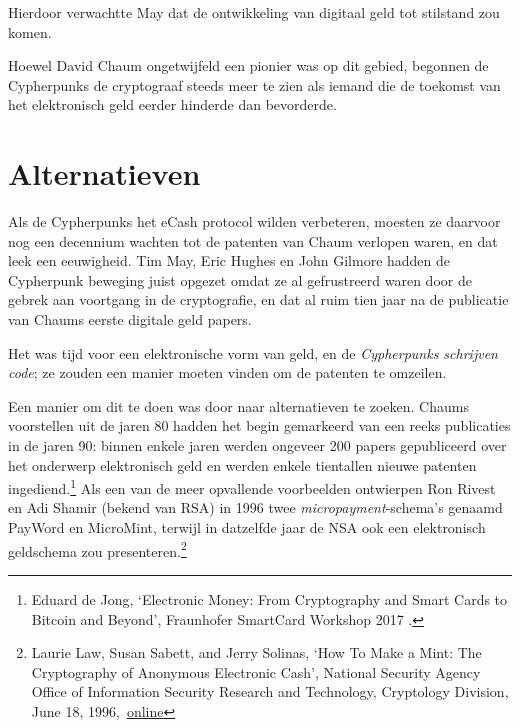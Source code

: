 \documentclass[
  a5paper,
  smalldemyvopaper,11pt,twoside,onecolumn,openright,extrafontsizes,
hidelinks]{memoir}
\begin{document}
Hierdoor verwachtte May dat de ontwikkeling van digitaal geld tot
stilstand zou komen.

Hoewel David Chaum ongetwijfeld een pionier was op dit gebied, begonnen
de Cypherpunks de cryptograaf steeds meer te zien als iemand die de
toekomst van het elektronisch geld eerder hinderde dan bevorderde.

\section{Alternatieven}\label{alternatieven}

Als de Cypherpunks het eCash protocol wilden verbeteren, moesten ze
daarvoor nog een decennium wachten tot de patenten van Chaum verlopen
waren, en dat leek een eeuwigheid. Tim May, Eric Hughes en John Gilmore
hadden de Cypherpunk beweging juist opgezet omdat ze al gefrustreerd
waren door de gebrek aan voortgang in de cryptografie, en dat al ruim
tien jaar na de publicatie van Chaums eerste digitale geld papers.

Het was tijd voor een elektronische vorm van geld, en de
\emph{Cypherpunks schrijven code}; ze zouden een manier moeten vinden om
de patenten te omzeilen.

Een manier om dit te doen was door naar alternatieven te zoeken. Chaums
voorstellen uit de jaren 80 hadden het begin gemarkeerd van een reeks
publicaties in de jaren 90: binnen enkele jaren werden ongeveer 200
papers gepubliceerd over het onderwerp elektronisch geld en werden
enkele tientallen nieuwe patenten ingediend.\footnote{Eduard de Jong,
  `Electronic Money: From Cryptography and Smart Cards to Bitcoin and
  Beyond', Fraunhofer SmartCard Workshop 2017 .} Als een van de meer
opvallende voorbeelden ontwierpen Ron Rivest en Adi Shamir (bekend van
RSA) in 1996 twee \emph{micropayment}-schema's genaamd PayWord en
MicroMint, terwijl in datzelfde jaar de NSA ook een elektronisch
geldschema zou presenteren.\footnote{Laurie Law, Susan Sabett, and Jerry
  Solinas, `How To Make a Mint: The Cryptography of Anonymous Electronic
  Cash', National Security Agency Office of Information Security
  Research and Technology, Cryptology Division, June 18,
  1996,~\href{https://groups.csail.mit.edu/mac/classes/6.805/articles/money/nsamint/nsamint.htm}{online}}
\end{document}
